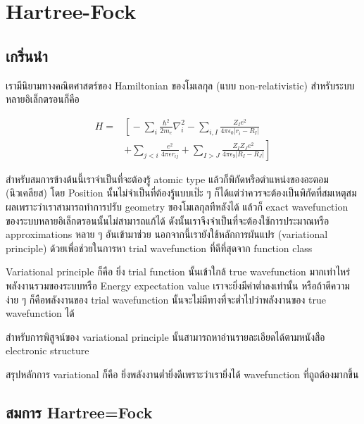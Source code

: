 
\chapter{Hartree-Fock}

\section{เกริ่นนำ}

เรามีนิยามทางคณิตศาสตร์ของ Hamiltonian ของโมเลกุล (แบบ non-relativistic) สำหรับระบบหลายอิเล็กตรอนก็คือ

\begin{equation}
    \begin{aligned}
        H = &
        \left[ \right.
        -\sum_{i} \frac{\hbar^{2}}{2m_{e}} \nabla^{2}_{i}
        -\sum_{i,I} \frac{Z_{I} e^{2}}{4\pi\epsilon_{0} |r_{i} - R_{I}|} \\
            & +\sum_{j<i} \frac{e^{2}}{4\pi\epsilon r_{ij}}
        +\sum_{I>J} \frac{Z_{I} Z_{J} e^{2}}{4\pi\epsilon_{9} |R_{I} - R_{J}|}
        \left. \right]
    \end{aligned}
\end{equation}

สำหรับสมการข้างต้นนี้เราจำเป็นที่จะต้องรู้ atomic type แล้วก็พิกัดหรือตำแหน่งของอะตอม (นิวเคลียส)
โดย Position นั้นไม่จำเป็นที่ต้องรู้แบบเป๊ะ ๆ ก็ได้แต่ว่าควรจะต้องเป็นพิกัดที่สมเหตุสมผลเพราะว่าเราสามารถทำการปรับ
geometry ของโมเลกุลทีหลังได้ แล้วก็ exact wavefunction ของระบบหลายอิเล็กตรอนนั้นไม่สามารถแก้ได้
ดังนั้นเราจึงจำเป็นที่จะต้องใช้การประมาณหรือ approximations หลาย ๆ อันเข้ามาช่วย นอกจากนี้เรายังใช้หลักการผันแปร
(variational principle) ด้วยเพื่อช่วยในการหา trial wavefunction ที่ดีที่สุดจาก function class

Variational principle ก็คือ ยิ่ง trial function นั้นเข้าใกล้ true wavefunction มากเท่าไหร่
พลังงานรวมของระบบหรือ Energy expectation value เราจะยิ่งมีค่าต่ำลงเท่านั้น หรือถ้าตีความง่าย ๆ
ก็คือพลังงานของ trial wavefunction นั้นจะไม่มีทางที่จะต่ำไปว่าพลังงานของ true wavefunction ได้

สำหรับการพิสูจน์ของ variational principle นั้นสามารถหาอ่านรายละเอียดได้ตามหนังสือ electronic
structure

สรุปหลักการ variational ก็คือ ยิ่งพลังงานต่ำยิ่งดีเพราะว่าเรายิ่งได้ wavefunction ที่ถูถต้องมากขึ้น

\section{สมการ Hartree=Fock}

